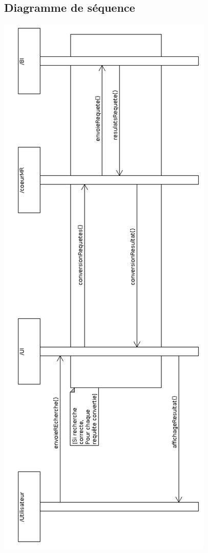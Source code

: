 \subsection{Diagramme de séquence}\label{sequence-recherche}
\begin{center}
\includegraphics[scale=0.44]{"images/sequence_util"}
\end{center}

